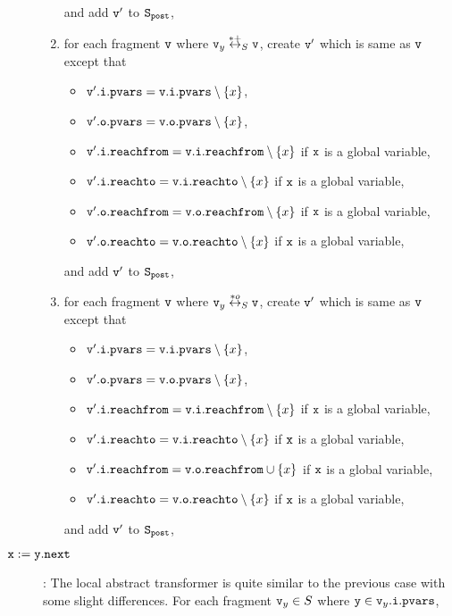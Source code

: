 \begin{description}
\begin{enumerate}
\begin{itemize}
\end{itemize}
and add $\mathtt{v}'$ to $\tt S_{post}$,
\item for each fragment $\mathtt{v}$ where $\mathtt{v}_y \overset{*+}\leftrightarrow_S \mathtt{v}$, create $\mathtt{v}'$ which is same as $\mathtt{v}$ except that
\begin{itemize}
\item $\mathtt{v}'.\mathtt{i}.\mathtt{pvars} = \mathtt{v}.\mathtt{i}.\mathtt{pvars} \setminus \left\{x\right\}$,
\item $\mathtt{v}'.\mathtt{o}.\mathtt{pvars} = \mathtt{v}.\mathtt{o}.\mathtt{pvars} \setminus \left\{x\right\}$,
\item $\mathtt{v}'.\mathtt{i}.\mathtt{reachfrom} = \mathtt{v}.\mathtt{i}.\mathtt{reachfrom} \setminus \left\{x\right\}$ if $\tt x$ is a global variable,
\item $\mathtt{v}'.\mathtt{i}.\mathtt{reachto} = \mathtt{v}.\mathtt{i}.\mathtt{reachto} \setminus \left\{x\right\}$ if $\tt x$ is a global variable,
\item $\mathtt{v}'.\mathtt{o}.\mathtt{reachfrom} = \mathtt{v}.\mathtt{o}.\mathtt{reachfrom} \setminus \left\{x\right\}$ if $\tt x$ is a global variable,
\item $\mathtt{v}'.\mathtt{o}.\mathtt{reachto} = \mathtt{v}.\mathtt{o}.\mathtt{reachto} \setminus \left\{x\right\}$ if $\tt x$ is a global variable,
\end{itemize}
and add $\mathtt{v}'$ to $\tt S_{post}$,
\item for each fragment $\mathtt{v}$ where $\mathtt{v}_y \overset{*o}\leftrightarrow_S \mathtt{v}$, create $\mathtt{v}'$ which is same as $\mathtt{v}$ except that
\begin{itemize}
\item $\mathtt{v}'.\mathtt{i}.\mathtt{pvars} = \mathtt{v}.\mathtt{i}.\mathtt{pvars} \setminus \left\{x\right\}$,
\item $\mathtt{v}'.\mathtt{o}.\mathtt{pvars} = \mathtt{v}.\mathtt{o}.\mathtt{pvars} \setminus \left\{x\right\}$,
\item $\mathtt{v}'.\mathtt{i}.\mathtt{reachfrom} = \mathtt{v}.\mathtt{i}.\mathtt{reachfrom} \setminus \left\{x\right\}$ if $\tt x$ is a global variable,
\item $\mathtt{v}'.\mathtt{i}.\mathtt{reachto} = \mathtt{v}.\mathtt{i}.\mathtt{reachto} \setminus \left\{x\right\}$ if $\tt x$ is a global variable,
\item $\mathtt{v}'.\mathtt{i}.\mathtt{reachfrom} = \mathtt{v}.\mathtt{o}.\mathtt{reachfrom} \cup \left\{x\right\}$ if $\tt x$ is a global variable,
\item $\mathtt{v}'.\mathtt{i}.\mathtt{reachto} = \mathtt{v}.\mathtt{o}.\mathtt{reachto} \setminus \left\{x\right\}$ if $\tt x$ is a global variable,
\end{itemize}
and add $\mathtt{v}'$ to $\tt S_{post}$,
\end{enumerate}
\item[${\tt x := y.next}$]: The local abstract transformer is quite similar to the previous case with some slight differences. For each fragment $\mathtt{v}_y \in S$ where $\mathtt{y} \in \mathtt{v}_y.\mathtt{i}.\mathtt{pvars}$,

\end{description}
